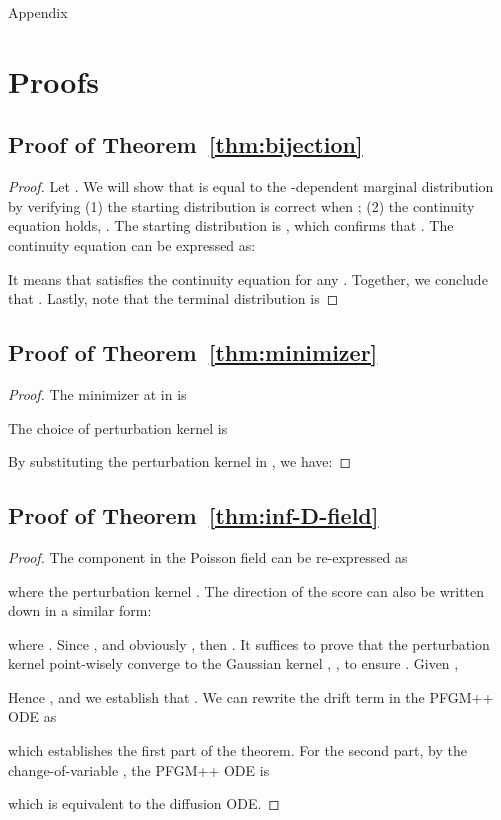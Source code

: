 \newpage
\onecolumn
{\huge Appendix}


\def\E{{\bf E}}
\def\x{{\bf x}}
\def\r{{\bf r}}
\def\rhat{\hat{r}}

\section{Proofs}

\label{app:proofs}

\subsection{Proof of Theorem~\ref{thm:bijection}}
\label{app:proof-bij}
\thmbij*
\begin{proof}
Let . We will show that  is equal to the -dependent marginal distribution  by verifying (1) the starting distribution is correct when ; (2) the continuity equation holds, \ie . The starting distribution is , which confirms that . The continuity equation can be expressed as:

It means that  satisfies the continuity equation for any . Together, we conclude that . Lastly, note that the terminal distribution is 

\end{proof}

\subsection{Proof of Theorem~\ref{thm:minimizer}}
\label{app:thm-minimizer}
\thmmin*
\begin{proof}
The minimizer at  in  is

The choice of perturbation kernel is

By substituting the perturbation kernel in , we have:

\end{proof}

\subsection{Proof of Theorem~\ref{thm:inf-D-field}}
\label{app:proof-thmfield}
\thmfield*
\begin{proof}
The  component in the Poisson field can be re-expressed as

 where the perturbation kernel . The direction of the score can also be written down in a similar form: 
 
where . Since , and obviously , then . It suffices to prove that the perturbation kernel  point-wisely converge to the Gaussian kernel , \ie , to ensure . Given , 
    
Hence , and we establish that . We can rewrite the drift term in the PFGM++ ODE as 

which establishes the first part of the theorem. For the second part, by the change-of-variable , the PFGM++ ODE is 

which is equivalent to the diffusion ODE.
\end{proof}


